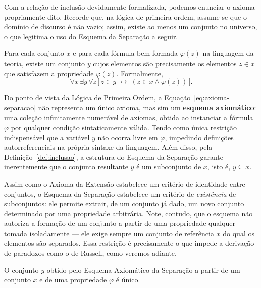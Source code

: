 Com a relação de inclusão devidamente formalizada, podemos enunciar o axioma propriamente dito. Recorde que, na lógica de primeira ordem, assume-se que o domínio de discurso é não vazio; assim, existe ao menos um conjunto no universo, o que legitima o uso do Esquema da Separação a seguir.

\begin{axioma}[Especificação]
\label{ax:separacao}
Para cada conjunto $x$ e para cada fórmula bem formada $\varphi(z)$ na linguagem da teoria, existe um conjunto $y$ cujos elementos são precisamente os elementos $z \in x$ que satisfazem a propriedade $\varphi(z)$. Formalmente,
\begin{equation}\label{eq:axioma-separacao}
    \forall x\, \exists y\, \forall z\,
        \bigl[\, z \in y \;\leftrightarrow\;
            (z \in x \land \varphi(z)) \,\bigr].
\end{equation}
\end{axioma}

Do ponto de vista da Lógica de Primeira Ordem, a Equação~\eqref{eq:axioma-separacao} não representa um único axioma, mas sim um \textbf{esquema axiomático}: uma coleção infinitamente numerável de axiomas, obtida ao instanciar a fórmula $\varphi$ por qualquer condição sintaticamente válida. Tendo como única restrição indispensável que a variável $y$ não ocorra livre em $\varphi$, impedindo definições autorreferenciais na própria sintaxe da linguagem. Além disso, pela Definição~\ref{def:inclusao}, a estrutura do Esquema da Separação garante inerentemente que o conjunto resultante $y$ é um subconjunto de $x$, isto é, $y \subseteq x$.

Assim como o Axioma da Extensão estabelece um critério de identidade entre conjuntos, o Esquema da Separação estabelece um critério de \emph{existência} de subconjuntos: ele permite extrair, de um conjunto já dado, um novo conjunto determinado por uma propriedade arbitrária. Note, contudo, que o esquema não autoriza a formação de um conjunto a partir de uma propriedade qualquer tomada isoladamente — ele exige sempre um conjunto de referência $x$ do qual os elementos são separados. Essa restrição é precisamente o que impede a derivação de paradoxos como o de Russell, como veremos adiante.

\begin{teorema}
\label{teo:unicidade-separacao}
O conjunto $y$ obtido pelo Esquema Axiomático da Separação a partir de um conjunto $x$ e de uma propriedade $\varphi$ é único.
\end{teorema}

